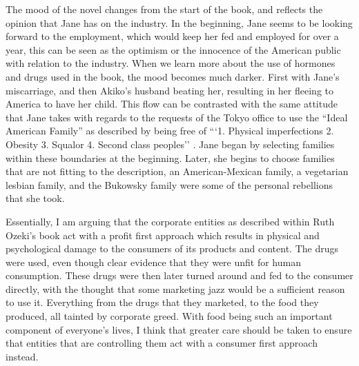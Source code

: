 \documentclass{article}
\begin{document}
The mood of the novel changes from the start of the book, and reflects the
opinion that Jane has on the industry. In the beginning, Jane seems to be
looking forward to the employment, which would keep her fed and employed for
over a year, this can be seen as the optimism or the innocence of the
American public with relation to the industry. When we learn more about the
use of hormones and drugs used in the book, the mood becomes much darker.
First with Jane's miscarriage, and then Akiko's husband beating her,
resulting in her fleeing to America to have her child. This flow can be
contrasted with the same attitude that Jane takes with regards to the
requests of the Tokyo office to use the ``Ideal American Family'' as
described by being free of ```1. Physical imperfections 2. Obesity 3.
Squalor 4. Second class peoples'' \cite[Ch. 1]{ozeki1998my}. Jane began by
selecting families within these boundaries at the beginning. Later, she
begins to choose families that are not fitting to the description, an
American-Mexican family, a vegetarian lesbian family, and the Bukowsky
family were some of the personal rebellions that she took.

Essentially, I am arguing that the corporate entities as described within
Ruth Ozeki's book  act with a profit first approach
which results in physical and psychological damage to the consumers of its
products and content. The drugs were used, even though clear evidence that
they were unfit for human consumption. These drugs were then later turned
around and fed to the consumer directly, with the thought that some
marketing jazz would be a sufficient reason to use it. Everything from the
drugs that they marketed, to the food they produced, all tainted by
corporate greed. With food being such an important component of everyone's
lives, I think that greater care should be taken to ensure that entities
that are controlling them act with a consumer first approach instead.

\makeworkscited
\end{document}
